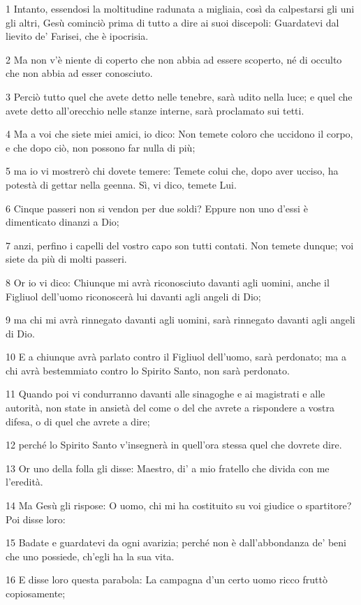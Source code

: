 \par 1 Intanto, essendosi la moltitudine radunata a migliaia, così da calpestarsi gli uni gli altri, Gesù cominciò prima di tutto a dire ai suoi discepoli: Guardatevi dal lievito de' Farisei, che è ipocrisia.
\par 2 Ma non v'è niente di coperto che non abbia ad essere scoperto, né di occulto che non abbia ad esser conosciuto.
\par 3 Perciò tutto quel che avete detto nelle tenebre, sarà udito nella luce; e quel che avete detto all'orecchio nelle stanze interne, sarà proclamato sui tetti.
\par 4 Ma a voi che siete miei amici, io dico: Non temete coloro che uccidono il corpo, e che dopo ciò, non possono far nulla di più;
\par 5 ma io vi mostrerò chi dovete temere: Temete colui che, dopo aver ucciso, ha potestà di gettar nella geenna. Sì, vi dico, temete Lui.
\par 6 Cinque passeri non si vendon per due soldi? Eppure non uno d'essi è dimenticato dinanzi a Dio;
\par 7 anzi, perfino i capelli del vostro capo son tutti contati. Non temete dunque; voi siete da più di molti passeri.
\par 8 Or io vi dico: Chiunque mi avrà riconosciuto davanti agli uomini, anche il Figliuol dell'uomo riconoscerà lui davanti agli angeli di Dio;
\par 9 ma chi mi avrà rinnegato davanti agli uomini, sarà rinnegato davanti agli angeli di Dio.
\par 10 E a chiunque avrà parlato contro il Figliuol dell'uomo, sarà perdonato; ma a chi avrà bestemmiato contro lo Spirito Santo, non sarà perdonato.
\par 11 Quando poi vi condurranno davanti alle sinagoghe e ai magistrati e alle autorità, non state in ansietà del come o del che avrete a rispondere a vostra difesa, o di quel che avrete a dire;
\par 12 perché lo Spirito Santo v'insegnerà in quell'ora stessa quel che dovrete dire.
\par 13 Or uno della folla gli disse: Maestro, di' a mio fratello che divida con me l'eredità.
\par 14 Ma Gesù gli rispose: O uomo, chi mi ha costituito su voi giudice o spartitore? Poi disse loro:
\par 15 Badate e guardatevi da ogni avarizia; perché non è dall'abbondanza de' beni che uno possiede, ch'egli ha la sua vita.
\par 16 E disse loro questa parabola: La campagna d'un certo uomo ricco fruttò copiosamente;
